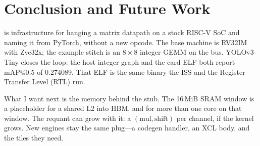 \section{Conclusion and Future Work}
\label{sec:conclusion}


\tv{} is infrastructure for hanging a matrix datapath on a stock
{RISC-V} {SoC} and naming it from {PyTorch}, without a new opcode.
The base machine is {RV32IM} with {Zve32x}; the example stitch is an
$8{\times}8$ integer {GEMM} on the bus.
{YOLOv3-Tiny} closes the loop: the host integer graph and the card
{ELF} both report {mAP@0.5} of 0.274089.
That {ELF} is the same binary the {ISS} and the Register-Transfer
Level ({RTL}) run.

What I want next is the memory behind the stub.
The 16\,{MiB} {SRAM} window is a placeholder for a shared {L2} into
{HBM}, and for more than one core on that window.
The requant can grow with it: a $(\mathrm{mul},\mathrm{shift})$ per
channel, if the kernel grows.
New engines stay the same plug---a codegen handler, an {XCL} body,
and the tiles they need.
